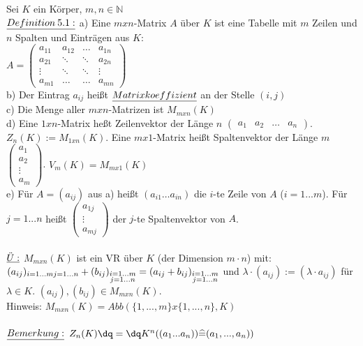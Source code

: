 \documentclass[fleqn, a4paper, 11pt]{article}
\begin{document}
Sei $K$ ein K\"orper, $m,n\in\mathbb{N}$\\
$\uline{Definition\:5.1:}$ a) Eine $mxn$-Matrix $A$ \"uber $K$ ist eine Tabelle mit $m$ Zeilen und $n$ Spalten und Eintr\"agen aus $K$:\\
$A=\begin{pmatrix}
	a_{11} & a_{12} & \dots & a_{1n} \\
	a_{21} & \ddots & \ddots & a_{2n} \\
	\vdots & \ddots & \ddots & \vdots \\
	a_{m1} & \dots & \dots & a_{mn}
\end{pmatrix}$\\
b) Der Eintrag $a_{ij}$ hei\ss{}t $\uline{Matrixkoeffizient}$ an der Stelle $(i,j)$\\
c) Die Menge aller $mxn$-Matrizen ist $M_{mxn}(K)$\\
d) Eine $1xn$-Matrix he\ss{}t Zeilenvektor der L\"ange $n$ $\begin{pmatrix}
	a_1 & a_2 &\dots & a_n
\end{pmatrix}$. $Z_n (K):=M_{1xn}(K)$. Eine $mx1$-Matrix hei\ss{}t Spaltenvektor der L\"ange $m$ $\begin{pmatrix}
	a_1 \\
	a_2 \\
	\vdots \\
	a_m
\end{pmatrix}$. $V_m (K) =M_{mx1}(K)$\\
e) F\"ur $A=(a_{ij})$ aus a) hei\ss{}t $(a_{i1} \dots a_{in})$ die $i$-te Zeile von $A$ ($i=1...m$). F\"ur $j=1...n$ hei\ss{}t $\begin{pmatrix}
	a_{1j}\\
	\vdots\\
	a_{mj}
\end{pmatrix}$
der $j$-te Spaltenvektor von $A$.\\
\\
$\uline{\ddot{U}:}$ $M_{mxn}(K)$ ist ein VR \"uber $K$ (der Dimension $m\cdot n$) mit: $(a_{ij})_{i=1...m\\ j=1...n}+(b_{ij})_{\substack{i=1...m\\ j=1...n}}=(a_{ij}+b_{ij})_{\substack{i=1...m\\ j=1...n}}$ und $\lambda\cdot(a_{ij}):=(\lambda\cdot a_{ij})$ f\"ur $\lambda\in K$. $(a_{ij}),(b_{ij})\in M_{mxn}(K)$.\\
Hinweis: $M_{mxn}(K)=Abb(\{1,...,m\}x\{1,...,n\},K)$\\
\\
$\uline{Bemerkung:}$ $Z_n (K)\dq = \dq K^n ((a_1 ...a_n))\widehat{=}(a_1 ,...,a_n))$\\
\end{document}

